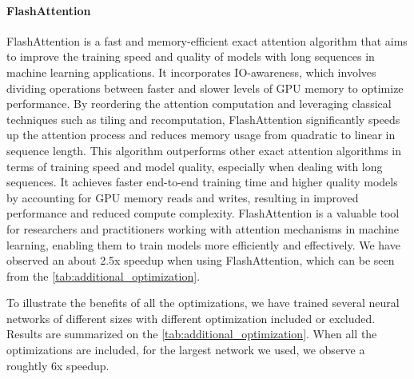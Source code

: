\paragraph{FlashAttention}

FlashAttention is a fast and memory-efficient exact attention algorithm that aims to improve the training speed and
quality of models with long sequences in machine learning applications. It incorporates IO-awareness, which involves
dividing operations between faster and slower levels of GPU memory to optimize performance. By reordering the attention
computation and leveraging classical techniques such as tiling and recomputation, FlashAttention significantly speeds up
the attention process and reduces memory usage from quadratic to linear in sequence length. This algorithm outperforms
other exact attention algorithms in terms of training speed and model quality, especially when dealing with long
sequences. It achieves faster end-to-end training time and higher quality models by accounting for GPU memory reads and
writes, resulting in improved performance and reduced compute complexity. FlashAttention is a valuable tool for
researchers and practitioners working with attention mechanisms in machine learning, enabling them to train models more
efficiently and effectively. We have observed an about 2.5x speedup when using FlashAttention, which can be seen from
the \autoref{tab:additional_optimization}.

To illustrate the benefits of all the optimizations, we have trained several neural networks of different sizes with
different optimization included or excluded.  Results are summarized on the \autoref{tab:additional_optimization}. When
all the optimizations are included, for the largest network we used, we observe a roughtly 6x speedup.

